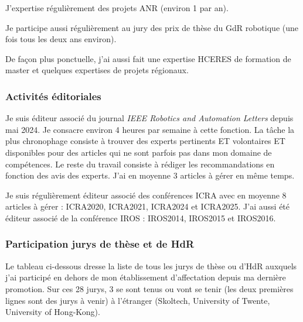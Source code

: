 \documentclass[a4paper,12pt]{article}
\begin{document}
J'expertise régulièrement des projets ANR (environ 1 par an).

Je participe aussi régulièrement au jury des prix de thèse du GdR robotique (une fois tous les deux ans environ).

De façon plus ponctuelle, j'ai aussi fait une expertise HCERES de formation de master et quelques expertises de projets régionaux.


\subsubsection{Activités éditoriales}

Je suis éditeur associé du journal \textit{IEEE Robotics and Automation Letters} depuis mai 2024. Je consacre environ 4 heures par semaine à cette fonction. La tâche la plus chronophage consiste à trouver des experts pertinents ET volontaires ET disponibles pour des articles qui ne sont parfois pas dans mon domaine de compétences. Le reste du travail consiste à rédiger les recommandations en fonction des avis des experts. J'ai en moyenne 3 articles à gérer en même temps.

Je suis régulièrement éditeur associé des conférences ICRA avec en moyenne 8 articles à gérer : ICRA2020, ICRA2021, ICRA2024 et ICRA2025. J'ai aussi été éditeur associé de la conférence IROS : IROS2014, IROS2015 et IROS2016.

\subsubsection{Participation jurys de thèse et de HdR}

Le tableau ci-dessous dresse la liste de tous les jurys de thèse ou d'HdR auxquels j'ai participé en dehors de mon établissement d'affectation depuis ma dernière promotion. Sur ces 28 jurys, 3 se sont tenus ou vont se tenir (les deux premières lignes sont des jurys à venir) à l'étranger (Skoltech, University of Twente, University of Hong-Kong).
\newline
\end{document}
